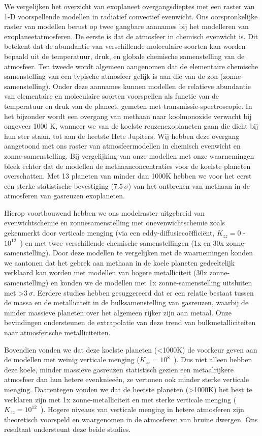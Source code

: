 We vergelijken het overzicht van exoplaneet overgangsdieptes met een raster van 1-D voorspellende modellen in radiatief convectief evenwicht. Ons oorspronkelijke raster van modellen berust op twee gangbare aannames bij het modelleren van exoplaneetatmosferen. De eerste is dat de atmosfeer in chemisch evenwicht is. Dit betekent dat de abundantie van verschillende moleculaire soorten kan worden bepaald uit de temperatuur, druk, en globale chemische samenstelling van de atmosfeer. Ten tweede wordt algemeen aangenomen dat de elementaire chemische samenstelling van een typische atmosfeer gelijk is aan die van de zon (zonne-samenstelling). Onder deze aannames kunnen modellen de relatieve abundantie van elementaire en moleculaire soorten voorspellen als functie van de temperatuur en druk van de planeet, gemeten met transmissie-spectroscopie. In het bijzonder wordt een overgang van methaan naar koolmonoxide verwacht bij ongeveer 1000 K, wanneer we van de koelste reuzenexoplaneten gaan die dicht bij hun ster staan, tot aan de heetste Hete Jupiters. Wij hebben deze overgang aangetoond met ons raster van atmosfeermodellen in chemisch evenwicht en zonne-samenstelling. Bij vergelijking van onze modellen met onze waarnemingen bleek echter dat de modellen de methaanconcentraties voor de koelste planeten overschatten. Met 13 planeten van minder dan 1000K hebben we voor het eerst een sterke statistische bevestiging ($7.5~\sigma$) van het ontbreken van methaan in de atmosferen van gasreuzen exoplaneten.

Hierop voortbouwend hebben we ons modelraster uitgebreid van evenwichtschemie en zonnesamenstelling met onevenwichtschemie zoals gekenmerkt door verticale menging (via een eddy-diffusiecoëfficiënt, $K_{zz} = 0$ - $10^{12}$~\cmcms) en met twee verschillende chemische samenstellingen (1x en 30x zonne-samenstelling). Door deze modellen te vergelijken met de waarnemingen konden we aantonen dat het gebrek aan methaan in de koele planeten gedeeltelijk verklaard kan worden met modellen van hogere metalliciteit (30x zonne-samenstelling) en konden we de modellen met 1x zonne-samenstelling uitsluiten met >$3~\sigma$. Eerdere studies hebben gesuggereerd dat er een relatie bestaat tussen de massa en de metalliciteit in de bulksamenstelling van gasreuzen, waarbij de minder massieve planeten over het algemeen rijker zijn aan metaal. Onze bevindingen ondersteunen de extrapolatie van deze trend van bulkmetalliciteiten naar atmosferische metalliciteiten.

Bovendien vonden we dat deze koelste planeten (<1000K) de voorkeur geven aan de modellen met weinig verticale menging ($K_{zz} = 10^8$~\cmcms). Dus niet alleen hebben deze koele, minder massieve gasreuzen statistisch gezien een metaalrijkere atmosfeer dan hun hetere evenknieeën, ze vertonen ook minder sterke verticale menging. Daarentegen vonden we dat de heetste planeten (>1000K) het best te verklaren zijn met 1x zonne-metalliciteit en met sterke verticale menging ($K_{zz}= 10^{12}$~\cmcms). Hogere niveaus van verticale menging in hetere atmosferen zijn theoretisch voorspeld en waargenomen in de atmosferen van bruine dwergen. Ons resultaat ondersteunt deze beide studies.

